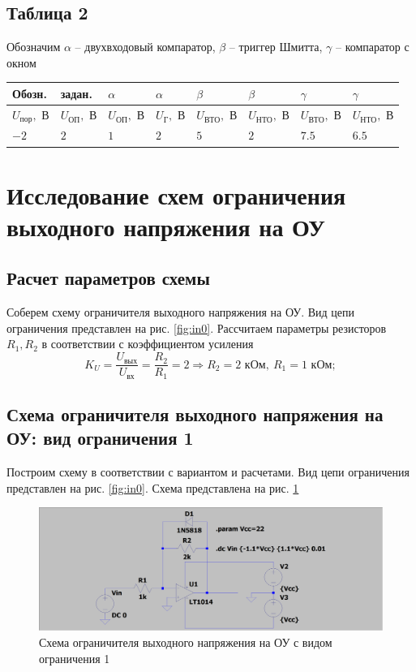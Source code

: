 \documentclass[a4paper, 12pt]{article}
\begin{document}
    \subsection{Таблица 2}
    Обозначим $\alpha$ -- двухвходовый компаратор, $\beta$ -- триггер Шмитта, $\gamma$ -- компаратор с окном
    \begin{center}
        \begin{tabular}{ | m{3.2em} | m{3em}| m{3em} | m{3em} | m{3.7em} | m{3.7em}| m{3.7em} | m{3.7em} |}
        \hline
        Обозн.& задан.& $\alpha$& $\alpha$& $\beta$& $\beta$& $\gamma$& $\gamma$\\ 
        \hline
        $U_{\text{пор}},$ В&$U_\text{ОП},$ В& $U_\text{ОП},$ В &$U_\text{Г},$ В&$U_\text{ВТО},$ В &$U_\text{НТО},$ В &$U_\text{ВТО},$ В &$U_\text{НТО},$ В\\ 
        \hline
        $-2$& $2$ & $1$ &$2$ &$5$ &$2$ &$7.5$ &$6.5$\\ 
        \hline
        \end{tabular}
    \end{center}


    \section{Исследование схем ограничения выходного напряжения на ОУ}
    \subsection{Расчет параметров схемы}
    Соберем схему ограничителя выходного напряжения на ОУ. Вид цепи ограничения представлен на рис. \ref{fig:in0}.
    Рассчитаем параметры резисторов $R_1,R_2$ в соответствии с коэффициентом усиления
    $$
    K_U=\dfrac{U_\text{вых}}{U_\text{вх}}=\dfrac{R_2}{R_1}=2\Rightarrow R_2=2\text{ кОм},\ R_1=1\text{ кОм};
    $$


    \subsection{Схема ограничителя выходного напряжения на ОУ: вид ограничения 1}
    Построим схему в соответствии с вариантом и расчетами. Вид цепи ограничения представлен на рис. \ref{fig:in0}.
    Схема представлена на рис. \ref{fig:scheme1}
    \begin{figure}[H]
        \centering
        \includegraphics[scale=0.22]{scheme1.png}
        \captionsetup{skip=0pt}
        \caption{Схема ограничителя выходного напряжения на ОУ с видом ограничения 1}
        \label{fig:scheme1}
    \end{figure}
\end{document}
